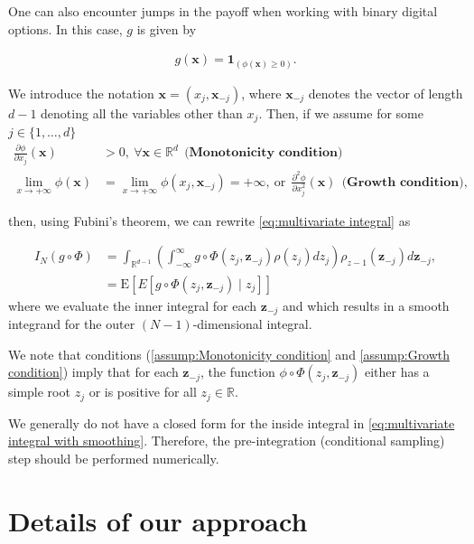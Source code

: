 \documentclass[11pt]{article}
\newcommand{\expt}[1]{\mathrm{E}\left[#1\right]}
\newcommand{\rset}{\mathbb{R}}
\newcommand{\COMMA}{,}
\begin{document}
One can also encounter jumps in the payoff when working with binary digital options. In this case, $g$ is given by 


\begin{align}\label{eq:payoffs_with_jump}
	g(\mathbf{x})=\mathbf{1}_{(\phi(\mathbf{x}) \ge 0)}.
\end{align}


We introduce the notation $\mathbf{x}=(x_j,\mathbf{x}_{-j})$, where $\mathbf{x}_{-j}$ denotes the vector of length $d-1$ denoting all the variables other than $x_j$. Then, if we assume for some $j \in \{1,\dots,d\}$
\begin{align}
	\frac{\partial \phi}{\partial x_j}(\mathbf{x}) &>0,\: \forall \mathbf{x} \in \rset^d \: \: \textbf{(Monotonicity condition)}  \label{assump:Monotonicity condition}\\
	\underset{x \rightarrow +\infty}{\lim} \phi(\mathbf{x})&=\underset{x \rightarrow +\infty}{\lim} \phi(x_j,\mathbf{x}_{-j})=+\infty, \: \text{or} \:\: \frac{\partial^2 \phi} {\partial x_j^2}(\mathbf{x}) \: \: \textbf{(Growth condition)}  \label{assump:Growth condition} \COMMA
\end{align}

then, using Fubini's theorem,  we can rewrite \eqref{eq:multivariate integral} as

\begin{align}\label{eq:multivariate integral with smoothing}
I_N (g \circ \Phi) &= \int_{\rset^{d-1}} \left(\int_{-\infty}^\infty g \circ\Phi(z_j,\mathbf{z}_{-j}) \rho(z_j) dz_j  \right) \rho_{z-1}(\mathbf{z}_{-j}) d\mathbf{z}_{-j}\COMMA \\ \nonumber	  
&= \expt{E \left[g \circ\Phi(z_j,\mathbf{z}_{-j}) \mid z_j \right]}
\end{align}
where we evaluate the inner integral for each $\mathbf{z}_{-j}$ and which results in a smooth integrand for the outer $(N-1)$-dimensional integral. 

We note that  conditions (\eqref{assump:Monotonicity condition} and \eqref{assump:Growth condition}) imply that for each $\mathbf{z}_{-j}$, the function $\phi \circ \Phi(z_j,\mathbf{z}_{-j})$ either has a simple  root $z_j$ or is positive for all $z_j \in \rset$.

We generally do not have a closed form for the inside integral in \ref{eq:multivariate integral with smoothing}. Therefore, the pre-integration (conditional sampling)  step should be performed numerically.


\section{Details of our approach}\label{sec:Details of our approach}
\end{document}
